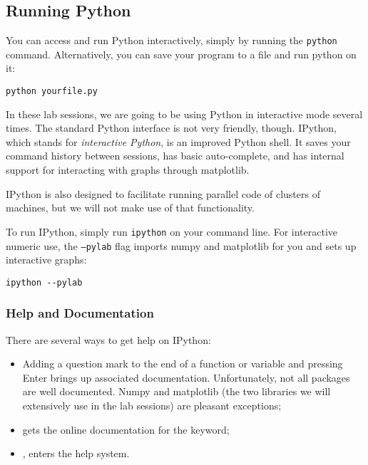 \subsection{Running Python}

You can access and run Python interactively, simply by running the
\texttt{python} command. Alternatively, you can save your program to a file
and run python on it:

\begin{verbatim}
python yourfile.py
\end{verbatim}

In these lab sessions, we are going to be using Python in interactive mode
several times. The standard Python interface is not very friendly, though.
IPython, which stands for \emph{interactive Python}, is an improved Python
shell. It saves your command history between sessions, has basic auto-complete,
and has internal support for interacting with graphs through matplotlib.

IPython is also designed to facilitate running parallel code of clusters of
machines, but we will not make use of that functionality.

To run IPython, simply run \texttt{ipython} on your command line. For
interactive numeric use, the \texttt{--pylab} flag imports numpy and matplotlib
for you and sets up interactive graphs:

\begin{verbatim}
ipython --pylab
\end{verbatim}


\subsubsection{Help and Documentation}

There are several ways to get help on IPython:

\begin{itemize}
\item Adding a question mark to the end of a function or variable and pressing Enter brings up associated documentation. Unfortunately, not all packages are well documented. Numpy and matplotlib (the two libraries we will extensively use in the lab sessions) are pleasant exceptions;
\item {} gets the online documentation for the  keyword;
\item {}, enters the help system.
\end{itemize}

